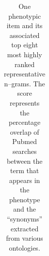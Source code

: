 \documentclass{sig-alternate}
\begin{document}
\begin{table}
\begin{center}
\begin{tabular}{l l}
%
\hline
\end{tabular}
\end{center}
\caption{One phenotypic item and its associated top eight most highly ranked representative n--grams. The score represents the percentage overlap of Pubmed searches between the term that appears in the phenotype and the ``synonyms'' extracted from various ontologies.}
\label{tab:pheno-n-gram}
\end{table}
\end{document}
